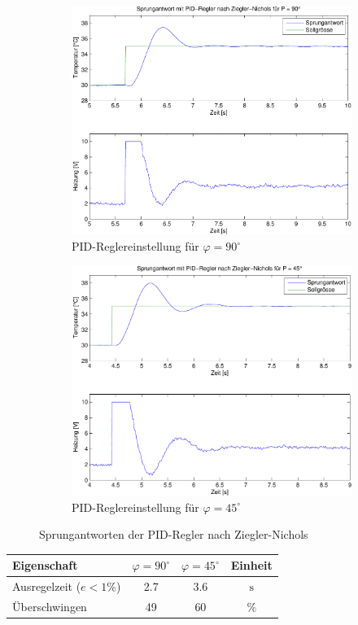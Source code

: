 \begin{figure}[h!]
	\centering
	\begin{subfigure}{0.475\textwidth}
		\includegraphics[width=1\textwidth]{06/pid_zn_full_plot.pdf}
		\caption{PID-Reglereinstellung für $\varphi = 90^\circ$}
	\end{subfigure}
	\begin{subfigure}{0.475\textwidth}
		\includegraphics[width=1\textwidth]{06/pid_zn_half_plot.pdf}
		\caption{PID-Reglereinstellung für $\varphi = 45^\circ$}
	\end{subfigure}
	\caption{Sprungantworten der PID-Regler nach Ziegler-Nichols}
\end{figure}

\begin{table}[h!]
	\centering
	\begin{tabular}{l c c c}
		Eigenschaft
			& $\varphi = 90^\circ$
			& $\varphi = 45^\circ$ 
			& Einheit\\
		\hline
		Ausregelzeit ($e < 1\%$)
			& 2.7
			& 3.6
			& $\si{\second}$ \\
		Überschwingen
			& 49
			& 60
			& $\%$
	\end{tabular}
\end{table}
